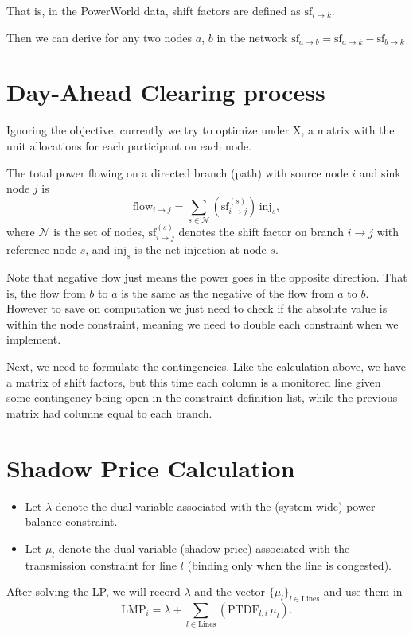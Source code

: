 \documentclass[11pt]{article}
\begin{document}
That is, in the PowerWorld data, shift factors are defined as $\text{sf}_{i \rightarrow k}$. 

Then we can derive for any two nodes $a$, $b$ in the network $\text{sf}_{a \rightarrow b} = \text{sf}_{a \rightarrow k} - \text{sf}_{b \rightarrow k}$

\section{Day-Ahead Clearing process}

Ignoring the objective, currently we try to optimize under X, a matrix with the unit allocations for each participant on each node.

The total power flowing on a directed branch (path) with source node $i$ and sink node $j$ is
\[
  \mathrm{flow}_{i\rightarrow j}
  = \sum_{s\in\mathcal{N}} \left(\mathrm{sf}^{(s)}_{i\rightarrow j}\right)\,\mathrm{inj}_s,
\]
where $\mathcal{N}$ is the set of nodes, $\mathrm{sf}^{(s)}_{i\rightarrow j}$ denotes the shift factor on branch $i\to j$ with reference node $s$, and $\mathrm{inj}_s$ is the net injection at node $s$.

Note that negative flow just means the power goes in the opposite direction. That is, the flow from $b$ to $a$ is the same as the negative of the flow from $a$ to $b$. However to save on computation we just need to check if the absolute value is within the node constraint, meaning we need to double each constraint when we implement.

Next, we need to formulate the contingencies. Like the calculation above, we have a matrix of shift factors, but this time each column is a monitored line given some contingency being open in the constraint definition list, while the previous matrix had columns equal to each branch.

\section{Shadow Price Calculation}

\begin{itemize}
  \item Let $\lambda$ denote the dual variable associated with the (system-wide) power-balance constraint.
  \item Let $\mu_l$ denote the dual variable (shadow price) associated with the transmission constraint for line $l$ (binding only when the line is congested).
\end{itemize}
After solving the LP, we will record $\lambda$ and the vector $\{\mu_l\}_{l\in\text{Lines}}$ and use them in
\[
  \mathrm{LMP}_i = \lambda + \sum_{l\in\text{Lines}} \left(\mathrm{PTDF}_{l,i}\,\mu_l\right).
\]
\end{document}
